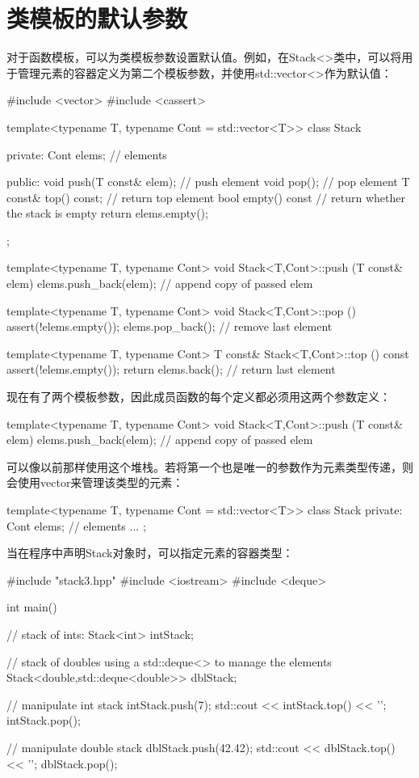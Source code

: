 \section{类模板的默认参数}

对于函数模板，可以为类模板参数设置默认值。例如，在Stack<>类中，可以将用于管理元素的容器定义为第二个模板参数，并使用std::vector<>作为默认值：

\begin{cpp}
#include <vector>
#include <cassert>

template<typename T, typename Cont = std::vector<T>>
class Stack {
private:
	Cont elems; // elements
	
public:
	void push(T const& elem); // push element
	void pop(); // pop element
	T const& top() const; // return top element
	bool empty() const { // return whether the stack is empty
		return elems.empty();
	}
};

template<typename T, typename Cont>
void Stack<T,Cont>::push (T const& elem)
{
	elems.push_back(elem); // append copy of passed elem
}

template<typename T, typename Cont>
void Stack<T,Cont>::pop ()
{
	assert(!elems.empty());
	elems.pop_back(); // remove last element
}

template<typename T, typename Cont>
T const& Stack<T,Cont>::top () const
{
	assert(!elems.empty());
	return elems.back(); // return last element
}
\end{cpp}

现在有了两个模板参数，因此成员函数的每个定义都必须用这两个参数定义：

\begin{cpp}
template<typename T, typename Cont>
void Stack<T,Cont>::push (T const& elem)
{
	elems.push_back(elem); // append copy of passed elem
}
\end{cpp}

可以像以前那样使用这个堆栈。若将第一个也是唯一的参数作为元素类型传递，则会使用vector来管理该类型的元素：

\begin{cpp}
template<typename T, typename Cont = std::vector<T>>
class Stack {
private:
	Cont elems; // elements
	...
};
\end{cpp}

当在程序中声明Stack对象时，可以指定元素的容器类型：

\begin{cpp}
#include "stack3.hpp"
#include <iostream>
#include <deque>

int main()
{
	// stack of ints:
	Stack<int> intStack;

	// stack of doubles using a std::deque<> to manage the elements
	Stack<double,std::deque<double>> dblStack;

	// manipulate int stack
	intStack.push(7);
	std::cout << intStack.top() << '\n';
	intStack.pop();

	// manipulate double stack
	dblStack.push(42.42);
	std::cout << dblStack.top() << '\n';
	dblStack.pop();
}
\end{cpp}

